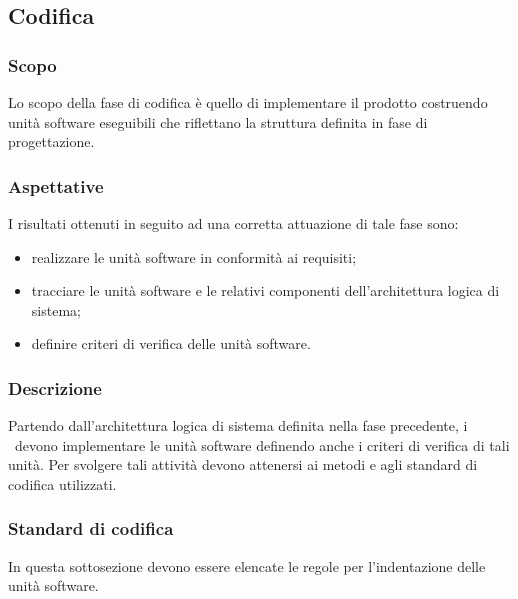 \documentclass[../NormeDiProgetto.tex]{subfiles}
\begin{document}
		\subsection{Codifica}
			\subsubsection{Scopo}
				Lo scopo della fase di codifica è quello di implementare il prodotto costruendo unità software eseguibili che riflettano la struttura definita in fase di progettazione.
			\subsubsection{Aspettative}
				I risultati ottenuti in seguito ad una corretta attuazione di tale fase sono:
				\begin{itemize}
					\item realizzare le unità software in conformità ai requisiti;
					\item tracciare le unità software e le relativi componenti dell'architettura logica di sistema;
					\item definire criteri di verifica delle unità software.
				\end{itemize}
			\subsubsection{Descrizione}
				Partendo dall'architettura logica di sistema definita nella fase precedente, i \programmatori\ devono implementare le unità software definendo anche i criteri di verifica di tali unità. Per svolgere tali attività devono attenersi ai metodi e agli standard di codifica utilizzati.
			\subsubsection{Standard di codifica}
				In questa sottosezione devono essere elencate le regole per l'indentazione delle unità software.
\end{document}
